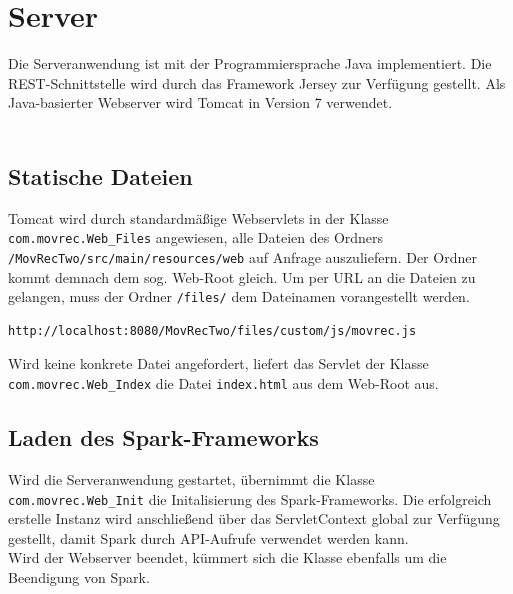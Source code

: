\section{Server}
Die Serveranwendung ist mit der Programmiersprache Java implementiert. Die REST-Schnittstelle wird durch das Framework \glqq Jersey\grqq\citep{lit:INET6} zur Verfügung gestellt. Als Java-basierter Webserver wird Tomcat in Version 7 verwendet.\\\\

\subsection{Statische Dateien}
Tomcat wird durch standardmäßige Webservlets in der Klasse \lstinline{com.movrec.Web_Files} angewiesen, alle Dateien des Ordners \lstinline{/MovRecTwo/src/main/resources/web} auf Anfrage auszuliefern. Der Ordner kommt demnach dem sog. \glqq Web-Root\grqq{} gleich. Um per URL an die Dateien zu gelangen, muss der Ordner \lstinline{/files/} dem Dateinamen vorangestellt werden.\\

\begin{lstlisting}[caption=Beispiel für den Aufruf einer Datei aus dem Web-Root]
http://localhost:8080/MovRecTwo/files/custom/js/movrec.js
\end{lstlisting}

Wird keine konkrete Datei angefordert, liefert das Servlet der Klasse \lstinline{com.movrec.Web_Index} die Datei \lstinline{index.html} aus dem Web-Root aus.


\subsection{Laden des Spark-Frameworks}
Wird die Serveranwendung gestartet, übernimmt die Klasse \lstinline{com.movrec.Web_Init} die Initalisierung des Spark-Frameworks. Die erfolgreich erstelle Instanz wird anschließend über das \glqq ServletContext\grqq{} global zur Verfügung gestellt, damit Spark durch API-Aufrufe verwendet werden kann.\\
Wird der Webserver beendet, kümmert sich die Klasse ebenfalls um die Beendigung von Spark.


